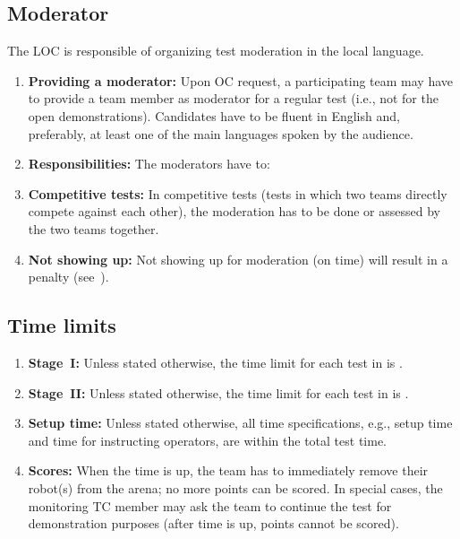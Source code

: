 \subsection{Moderator}
\label{rule:moderator}
The LOC is responsible of organizing test moderation in the local language.
\begin{enumerate}
	\item \textbf{Providing a moderator:}
	Upon OC request, a participating team may have to provide a team member as moderator for a regular test (i.e., not for the open demonstrations).
	Candidates have to be fluent in English and, preferably, at least one of the main languages spoken by the audience.
	\item \textbf{Responsibilities:} The moderators have to:
	\item \textbf{Competitive tests:} In competitive tests (tests in which two teams directly compete against each other), the moderation has to be done or assessed by the two teams together.
	\item \textbf{Not showing up:} Not showing up for moderation (on time) will result in a penalty (see~).
\end{enumerate}


\subsection{Time limits}
\label{rule:time_limits}
\begin{enumerate}
	\item \textbf{Stage~I:} Unless stated otherwise, the time limit for each test in  is .
	\item \textbf{Stage~II:} Unless stated otherwise, the time limit for each test in  is .
	\item \textbf{Setup time:} Unless stated otherwise, all time specifications, e.g., setup time and time for instructing operators, are within the total test time.
	\item \textbf{Scores:} When the time is up, the team has to immediately remove their robot(s) from the arena; no more points can be scored. In special cases, the monitoring TC member may ask the team to continue the test for demonstration purposes (after time is up, points cannot be scored).
\end{enumerate}



